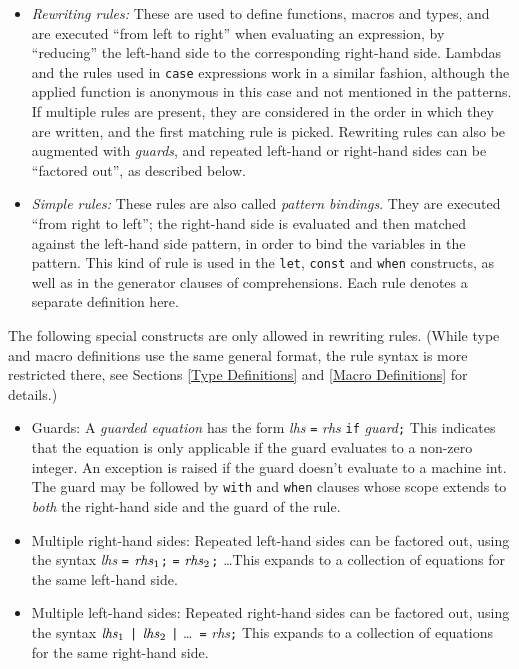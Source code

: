 \documentclass[a4paper,12pt]{article}
\newcommand{\nt}[1]{\textrm{\textit{#1\/}}}
\begin{document}
\begin{itemize}
\item \emph{Rewriting rules:} These are used to define functions, macros and types, and are executed ``from left to right'' when evaluating an expression, by ``reducing'' the left-hand side to the corresponding right-hand side. Lambdas and the rules used in \lstinline{case} expressions work in a similar fashion, although the applied function is anonymous in this case and not mentioned in the patterns. If multiple rules are present, they are considered in the order in which they are written, and the first matching rule is picked. Rewriting rules can also be augmented with \emph{guards}, and repeated left-hand or right-hand sides can be ``factored out'', as described below.
\item \emph{Simple rules:} These rules are also called \emph{pattern bindings}. They are executed ``from right to left''; the right-hand side is evaluated and then matched against the left-hand side pattern, in order to bind the variables in the pattern. This kind of rule is used in the \lstinline{let}, \lstinline{const} and \lstinline{when} constructs, as well as in the generator clauses of comprehensions. Each rule denotes a separate definition here.
\end{itemize}

The following special constructs are only allowed in rewriting rules. (While type and macro definitions use the same general format, the rule syntax is more restricted there, see Sections \ref{Type Definitions} and \ref{Macro Definitions} for details.)

\begin{itemize}
\item Guards: A \emph{guarded equation} has the form \nt{lhs} \verb|=| \nt{rhs} \lstinline{if} \nt{guard}\verb|;| This indicates that the equation is only applicable if the guard evaluates to a non-zero integer. An exception is raised if the guard doesn't evaluate to a machine int. The guard may be followed by \lstinline{with} and \lstinline{when} clauses whose scope extends to \emph{both} the right-hand side and the guard of the rule.
\item Multiple right-hand sides: Repeated left-hand sides can be factored out, using the syntax \nt{lhs} \verb|=| $\nt{rhs}_1$\verb|;| \verb|=| $\nt{rhs}_2$\verb|;| \dots This expands to a collection of equations for the same left-hand side.
\item Multiple left-hand sides: Repeated right-hand sides can be factored out, using the syntax $\nt{lhs}_1$ \verb?|? $\nt{lhs}_2$ \verb?|? \ldots\ \verb|=| \nt{rhs}\verb|;| This expands to a collection of equations for the same right-hand side.
\end{itemize}
\end{document}
